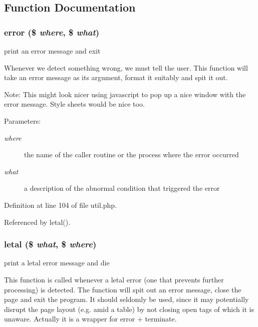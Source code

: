 \subsection{Function Documentation}
\subsubsection{\setlength{\rightskip}{0pt plus 5cm}error (\$ {\em where}, \$ {\em what})}\label{util_8php_a3}


print an error message and exit 

Whenever we detect something wrong, we must tell the user. This function will take an error message as its argument, format it suitably and spit it out.

\begin{Desc}
\item[Note:]This might look nicer using javascript to pop up a nice window with the error message. Style sheets would be nice too.\end{Desc}
\begin{Desc}
\item[Parameters:]
\begin{description}
\item[{\em where}]the name of the caller routine or the process where the error occurred \item[{\em what}]a description of the abnormal condition that triggered the error \end{description}
\end{Desc}


Definition at line 104 of file util.php.

Referenced by letal().
\subsubsection{\setlength{\rightskip}{0pt plus 5cm}letal (\$ {\em what}, \$ {\em where})}\label{util_8php_a4}


print a letal error message and die 

This function is called whenever a letal error (one that prevents further processing) is detected. The function will spit out an error message, close the page and exit the program. It should seldomly be used, since it may potentially disrupt the page layout (e.g. amid a table) by not closing open tags of which it is unaware. Actually it is a wrapper for error + terminate.

